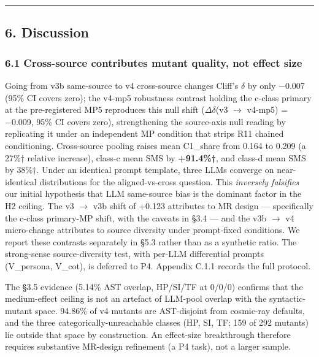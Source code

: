 \documentclass[review,12pt,authoryear]{elsarticle}
\begin{document}
\begin{center}\rule{0.5\linewidth}{0.5pt}\end{center}

\subsection{6. Discussion}\label{discussion}

\subsubsection{6.1 Cross-source contributes mutant quality, not effect
size}\label{cross-source-contributes-mutant-quality-not-effect-size}

Going from v3b same-source to v4 cross-source changes Cliff's $\delta$ by only
−0.007 (95\% CI covers zero); the v4-mp5 robustness contrast holding the
c-class primary at the pre-registered MP5 reproduces this null shift
($\Delta$$\delta$(v3 $\to$ v4-mp5) = −0.009, 95\% CI covers zero), strengthening the
source-axis null reading by replicating it under an independent MP
condition that strips R11 chained conditioning. Cross-source pooling
raises mean C1\_share from 0.164 to 0.209 (a 27\%† relative increase),
class-c mean SMS by \textbf{+91.4\%†}, and class-d mean SMS by 38\%†.
Under an identical prompt template, three LLMs converge on
near-identical distributions for the aligned-vs-cross question. This
\emph{inversely falsifies} our initial hypothesis that LLM same-source
bias is the dominant factor in the H2 ceiling. The v3 $\to$ v3b shift of
+0.123 attributes to MR design --- specifically the c-class primary-MP
shift, with the caveats in §3.4 --- and the v3b $\to$ v4 micro-change
attributes to source diversity under prompt-fixed conditions. We report
these contrasts separately in §5.3 rather than as a synthetic ratio. The
strong-sense source-diversity test, with per-LLM differential prompts
(V\_persona, V\_cot), is deferred to P4. Appendix C.1.1 records the full
protocol.

The §3.5 evidence (5.14\% AST overlap, HP/SI/TF at 0/0/0) confirms that
the medium-effect ceiling is not an artefact of LLM-pool overlap with
the syntactic-mutant space. 94.86\% of v4 mutants are AST-disjoint from
cosmic-ray defaults, and the three categorically-unreachable classes
(HP, SI, TF; 159 of 292 mutants) lie outside that space by construction.
An effect-size breakthrough therefore requires substantive MR-design
refinement (a P4 task), not a larger sample.
\end{document}
